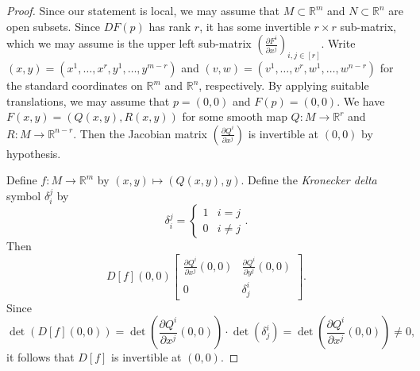 \documentclass[10pt,letterpaper,cm]{nupset}
\theoremstyle{definition}
\theoremstyle{theorem}
\theoremstyle{remark}
\newcommand{\R}{\mathbb R}
\newcommand{\1}{\mathbf{1}}
\newcommand{\0}{\vec 0}
\begin{document}
\begin{proof}
Since our statement is local, we may assume that $M\subset \R^m$ and $N\subset \R^n$ are open subsets. Since $DF(p)$ has rank $r$, it has some invertible $r\times r$ sub-matrix, which we may assume is the upper left sub-matrix $\left(\frac{\partial{F^i}}{\partial{x^j}}\right)_{i,j\in [r]}$. Write $\left(x,y\right) = \left(x^1, \ldots, x^r, y^1, \ldots, y^{m-r}\right)$ and $\left(v,w\right) = \left(v^1, \ldots, v^r, w^1, \ldots, w^{n-r}\right)$ for the standard coordinates on $\R^m$ and $\R^n$, respectively. By applying suitable translations, we may assume that $p=\left(0,0\right)$ and $F(p)= \left(0,0\right)$. We have $F(x,y)= (Q(x,y), R(x,y))$ for some smooth map $Q: M \to \R^r$ and $R: M \to \R^{n-r}$. Then the Jacobian matrix $\left(\frac{\partial{Q^i}}{\partial{x^j}} \right)$ is invertible at $\left(0,0\right)$ by hypothesis. 

\medskip


Define $f : M \to \R^m$ by $\left(x,y\right) \mapsto \left(Q(x,y), y\right)$. Define the \textit{Kronecker delta} symbol $\delta_i^j$ by 
$$\delta_i^j = \begin{cases} 1 & i=j \\ 0 & i \ne j \end{cases}.$$  Then $$D[f]\left(0,0\right) \begin{bmatrix} \frac{\partial{Q^i}}{\partial{x^j}}\left(0,0\right) & \frac{\partial{Q^i}}{\partial{y^j}}\left(0,0\right) \\ 0 & \delta^i_j     \end{bmatrix}   .$$ Since $$\det(D[f]\left(0,0\right)) = \det \left( \frac{\partial{Q^i}}{\partial{x^j}}\left(0,0\right) \right) \cdot \det(\delta^i_j) = \det \left( \frac{\partial{Q^i}}{\partial{x^j}}\left(0,0\right)  \right) \ne 0,$$ it follows that $D[f]$ is invertible at $\left(0,0\right)$. 

\medskip


\end{proof}
\end{document}
